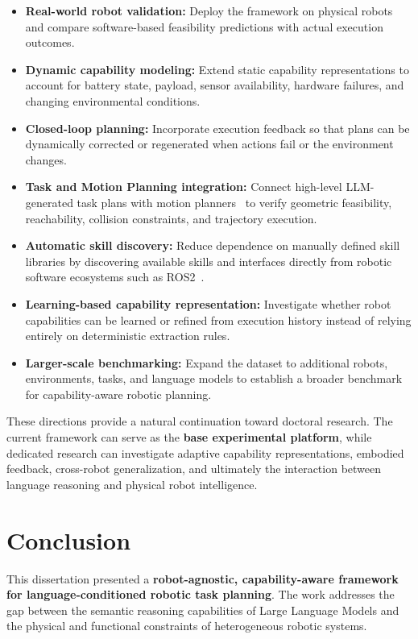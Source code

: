 \documentclass[12pt,a4paper]{article}
\begin{document}
\begin{itemize}
  \item \textbf{Real-world robot validation:} Deploy the framework on physical robots and compare software-based feasibility predictions with actual execution outcomes.
  \item \textbf{Dynamic capability modeling:} Extend static capability representations to account for battery state, payload, sensor availability, hardware failures, and changing environmental conditions.
  \item \textbf{Closed-loop planning:} Incorporate execution feedback so that plans can be dynamically corrected or regenerated when actions fail or the environment changes.
  \item \textbf{Task and Motion Planning integration:} Connect high-level LLM-generated task plans with motion planners~\cite{tamp} to verify geometric feasibility, reachability, collision constraints, and trajectory execution.
  \item \textbf{Automatic skill discovery:} Reduce dependence on manually defined skill libraries by discovering available skills and interfaces directly from robotic software ecosystems such as ROS2~\cite{ros2}.
  \item \textbf{Learning-based capability representation:} Investigate whether robot capabilities can be learned or refined from execution history instead of relying entirely on deterministic extraction rules.
  \item \textbf{Larger-scale benchmarking:} Expand the dataset to additional robots, environments, tasks, and language models to establish a broader benchmark for capability-aware robotic planning.
\end{itemize}

These directions provide a natural continuation toward doctoral research.
The current framework can serve as the \textbf{base experimental platform}, while dedicated research can investigate adaptive capability representations, embodied feedback, cross-robot generalization, and ultimately the interaction between language reasoning and physical robot intelligence.

\section{Conclusion}

This dissertation presented a \textbf{robot-agnostic, capability-aware framework for language-conditioned robotic task planning}.
The work addresses the gap between the semantic reasoning capabilities of Large Language Models and the physical and functional constraints of heterogeneous robotic systems.
\end{document}
